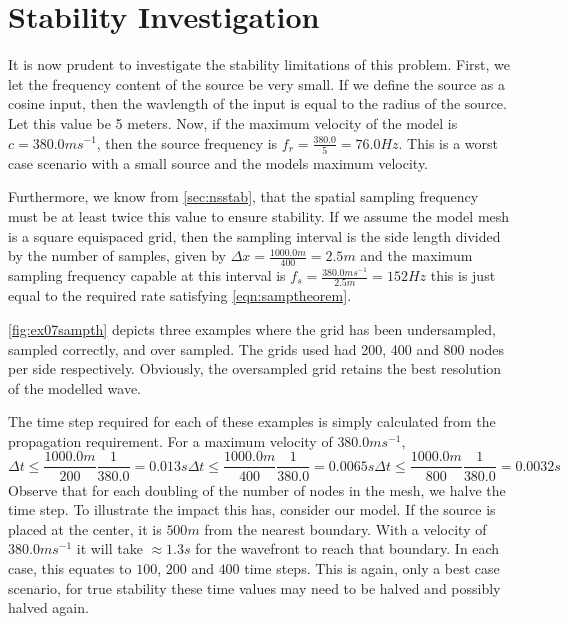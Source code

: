 \section{Stability Investigation}
It is now prudent to investigate the stability limitations of this problem.
First, we let the frequency content of the source be very small. If we define
the source as a cosine input, then the wavlength of the input is equal to the
radius of the source. Let this value be 5 meters. Now, if the maximum velocity
of the model is $c=380.0ms^{-1}$, then the source
frequency is $f_{r} = \frac{380.0}{5} = 76.0 Hz$. This is a worst case
scenario with a small source and the models maximum velocity. 

Furthermore, we know from \autoref{sec:nsstab}, that the spatial sampling
frequency must be at least twice this value to ensure stability. If we assume
the model mesh is a square equispaced grid,
then the sampling interval is the side length divided by the number of samples,
given by $\Delta x = \frac{1000.0m}{400} = 2.5m$ and the maximum sampling
frequency capable at this interval is
$f_{s}=\frac{380.0ms^{-1}}{2.5m}=152Hz$ this is just equal to the
required rate satisfying \autoref{eqn:samptheorem}. 

\autoref{fig:ex07sampth} depicts three examples where the grid has been
undersampled, sampled correctly, and over sampled. The grids used had
200, 400 and 800 nodes per side respectively. Obviously, the oversampled grid
retains the best resolution of the modelled wave.

The time step required for each of these examples is simply calculated from
the propagation requirement. For a maximum velocity of $380.0ms^{-1}$,
\begin{subequations}
 \begin{equation}
  \Delta t \leq \frac{1000.0m}{200} \frac{1}{380.0} = 0.013s
 \end{equation}
 \begin{equation}
  \Delta t \leq \frac{1000.0m}{400} \frac{1}{380.0} = 0.0065s
 \end{equation}
 \begin{equation}
  \Delta t \leq \frac{1000.0m}{800} \frac{1}{380.0} = 0.0032s
 \end{equation}
\end{subequations}
Observe that for each doubling of the number of nodes in the mesh, we halve
the time step. To illustrate the impact this has, consider our model. If the
source is placed at the center, it is $500m$ from the nearest boundary. With a
velocity of $380.0ms^{-1}$ it will take $\approx1.3s$ for the wavefront to
reach that boundary. In each case, this equates to $100$,  $200$ and $400$ time
steps. This is again, only a best case scenario, for true stability these time
values may need to be halved and possibly halved again.

